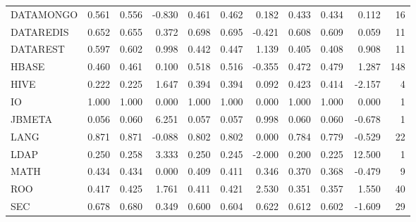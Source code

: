 \begin{tabular}{lrrrrrrrrrr}
DATAMONGO     & 0.561 &     0.556 &               -0.830 &     0.461 &         0.462 &                    0.182 &       0.433 &           0.434 &                      0.112 &     16 \\
DATAREDIS     & 0.652 &     0.655 &                0.372 &     0.698 &         0.695 &                   -0.421 &       0.608 &           0.609 &                      0.059 &     11 \\
DATAREST      & 0.597 &     0.602 &                0.998 &     0.442 &         0.447 &                    1.139 &       0.405 &           0.408 &                      0.908 &     11 \\
HBASE         & 0.460 &     0.461 &                0.100 &     0.518 &         0.516 &                   -0.355 &       0.472 &           0.479 &                      1.287 &    148 \\
HIVE          & 0.222 &     0.225 &                1.647 &     0.394 &         0.394 &                    0.092 &       0.423 &           0.414 &                     -2.157 &      4 \\
IO            & 1.000 &     1.000 &                0.000 &     1.000 &         1.000 &                    0.000 &       1.000 &           1.000 &                      0.000 &      1 \\
JBMETA        & 0.056 &     0.060 &                6.251 &     0.057 &         0.057 &                    0.998 &       0.060 &           0.060 &                     -0.678 &      1 \\
LANG          & 0.871 &     0.871 &               -0.088 &     0.802 &         0.802 &                    0.000 &       0.784 &           0.779 &                     -0.529 &     22 \\
LDAP          & 0.250 &     0.258 &                3.333 &     0.250 &         0.245 &                   -2.000 &       0.200 &           0.225 &                     12.500 &      1 \\
MATH          & 0.434 &     0.434 &                0.000 &     0.409 &         0.411 &                    0.346 &       0.370 &           0.368 &                     -0.479 &      9 \\
ROO           & 0.417 &     0.425 &                1.761 &     0.411 &         0.421 &                    2.530 &       0.351 &           0.357 &                      1.550 &     40 \\
SEC           & 0.678 &     0.680 &                0.349 &     0.600 &         0.604 &                    0.622 &       0.612 &           0.602 &                     -1.609 &     29 \\

\end{tabular}
